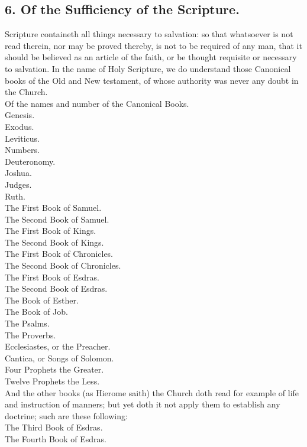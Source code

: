 \subsection{6.  Of the Sufficiency of the Scripture.}
 Scripture containeth all things necessary to salvation: so that whatsoever is not read therein, nor may be proved thereby, is not to be required of any man, that it should be believed as an article of the faith, or be thought requisite or necessary to salvation. In the name of Holy Scripture, we do understand those Canonical books of the Old and New testament, of whose authority was never any doubt in the Church.\\
Of the names and number of the Canonical Books.\\
Genesis.\\
Exodus.\\
Leviticus.\\
Numbers.\\
Deuteronomy.\\
Joshua.\\
Judges.\\
Ruth.\\
The First Book of Samuel.\\
The Second Book of Samuel.\\
The First Book of Kings.\\
The Second Book of Kings.\\
The First Book of Chronicles.\\
The Second Book of Chronicles.\\
The First Book of Esdras.\\
The Second Book of Esdras.\\
The Book of Esther.\\
The Book of Job.\\
The Psalms.\\
The Proverbs.\\
Ecclesiastes, or the Preacher.\\
Cantica, or Songs of Solomon.\\
Four Prophets the Greater.\\
Twelve Prophets the Less.\\
And the other books (as Hierome saith) the Church doth read for example of life and instruction of manners; but yet doth it not apply them to establish any doctrine; such are these following:\\
The Third Book of Esdras.\\
The Fourth Book of Esdras.\\
